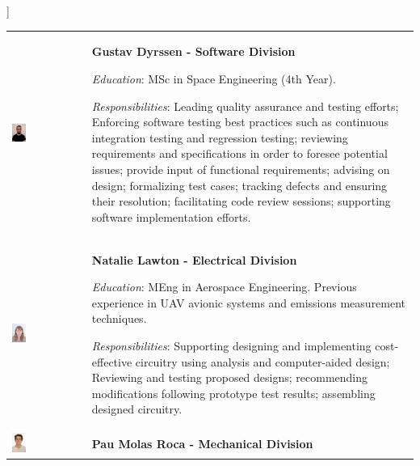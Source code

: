 ]\documentclass[a4paper,12pt,twoside]{article}
\begin{document}
\begin{longtable}[]{m{} m{}}
\includegraphics[width=0.2\textwidth]{1-introduction/img/gustav-dryssen.jpg} & \textbf{Gustav Dyrssen - Software Division}

\smallskip
\textit{Education}: MSc in Space Engineering (4th Year).

\smallskip
\textit{Responsibilities}: Leading quality assurance and testing efforts; Enforcing software testing best practices such as continuous integration testing and regression testing; reviewing requirements and specifications in order to foresee potential issues; provide input of functional requirements; advising on design; formalizing test cases; tracking defects and ensuring their resolution; facilitating code review sessions; supporting software implementation efforts.     
\bigskip
\\


\includegraphics[width=0.2\textwidth]{1-introduction/img/natalie-lawton.jpg} & \textbf{Natalie Lawton - Electrical Division}

\smallskip
\textit{Education}: MEng in Aerospace Engineering. Previous experience in UAV avionic systems and emissions measurement techniques.

\smallskip
\textit{Responsibilities}: Supporting designing and implementing cost-effective circuitry using analysis and computer-aided design; Reviewing and testing proposed designs; recommending modifications following prototype test results; assembling designed circuitry. 
\bigskip
\\

\includegraphics[width=0.2\textwidth]{1-introduction/img/pau-molas-roca.jpg} & \textbf{Pau Molas Roca - Mechanical Division}


\end{longtable}
\end{document}
